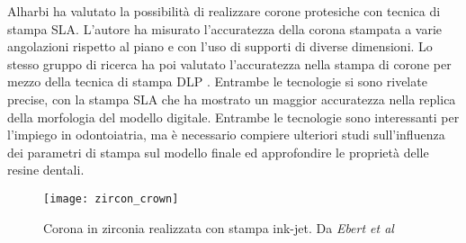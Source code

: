 Alharbi \parencite{Reference101} ha valutato la possibilità di realizzare corone protesiche con tecnica di stampa SLA. L'autore ha misurato l'accuratezza della corona stampata a varie angolazioni rispetto al piano e con l'uso di supporti di diverse dimensioni. Lo stesso gruppo di ricerca ha poi valutato l'accuratezza nella stampa di corone per mezzo della tecnica di stampa DLP \parencite{Reference102}. Entrambe le tecnologie si sono rivelate precise, con la stampa SLA che ha mostrato un maggior accuratezza nella replica della morfologia del modello digitale. Entrambe le tecnologie sono interessanti per l'impiego in odontoiatria, ma è necessario compiere ulteriori studi sull'influenza dei parametri di stampa sul modello finale ed approfondire le proprietà delle resine dentali.\\
\begin{wrapfigure} {R} {0.4\textwidth}
\vspace{-20pt}
	\begin{center}
	\texttt{[image: zircon\_crown]}
    \caption{Corona in zirconia realizzata con stampa ink-jet. Da \emph{Ebert et al} \parencite{Reference106}}
    \label{fig:zircon_crown}
    \end{center}
\vspace{-20pt}
\end{wrapfigure}

